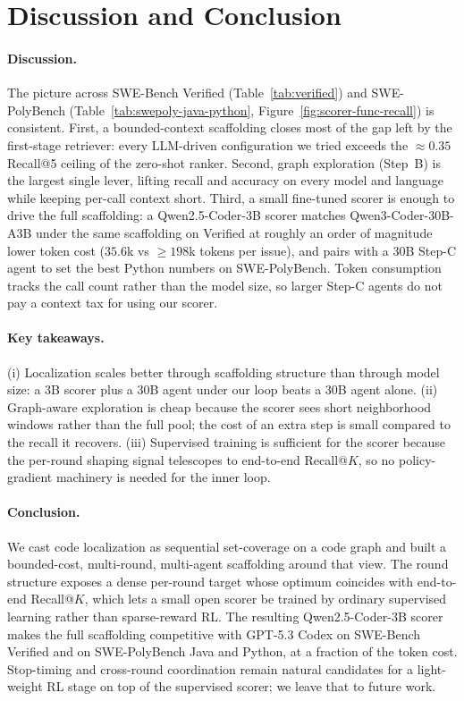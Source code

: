 \section{Discussion and Conclusion}
\label{sec:conclusion}

\paragraph{Discussion.}
The picture across SWE-Bench Verified
(Table~\ref{tab:verified}) and SWE-PolyBench
(Table~\ref{tab:swepoly-java-python},
Figure~\ref{fig:scorer-func-recall}) is consistent. First, a
bounded-context scaffolding closes most of the gap left by the
first-stage retriever: every LLM-driven configuration we tried
exceeds the $\approx0.35$ Recall@5 ceiling of the zero-shot
ranker. Second, graph exploration (Step~B) is the largest single
lever, lifting recall and accuracy on every model and language
while keeping per-call context short. Third, a small fine-tuned
scorer is enough to drive the full scaffolding: a
Qwen2.5-Coder-3B scorer matches Qwen3-Coder-30B-A3B under the
same scaffolding on Verified at roughly an order of magnitude
lower token cost ($35.6$k vs $\geq 198$k tokens per issue), and
pairs with a 30B Step-C agent to set the best Python numbers on
SWE-PolyBench.
Token consumption tracks the call count rather than the model
size, so larger Step-C agents do not pay a context tax for using
our scorer.

\paragraph{Key takeaways.}
(i) Localization scales better through scaffolding structure
than through model size: a 3B scorer plus a 30B agent under our
loop beats a 30B agent alone. (ii) Graph-aware exploration is
cheap because the scorer sees short neighborhood windows rather
than the full pool; the cost of an extra step is small compared
to the recall it recovers. (iii) Supervised training is
sufficient for the scorer because the per-round shaping signal
telescopes to end-to-end Recall@$K$, so no policy-gradient
machinery is needed for the inner loop.

\paragraph{Conclusion.}
We cast code localization as sequential set-coverage on a code
graph and built a bounded-cost, multi-round, multi-agent
scaffolding around that view. The round structure exposes a
dense per-round target whose optimum coincides with end-to-end
Recall@$K$, which lets a small open scorer be trained by
ordinary supervised learning rather than sparse-reward RL. The
resulting Qwen2.5-Coder-3B scorer makes the full scaffolding
competitive with GPT-5.3 Codex on SWE-Bench Verified and on
SWE-PolyBench Java and Python, at a fraction of the token cost.
Stop-timing and cross-round coordination remain natural
candidates for a light-weight RL stage on top of the supervised
scorer; we leave that to future work.
